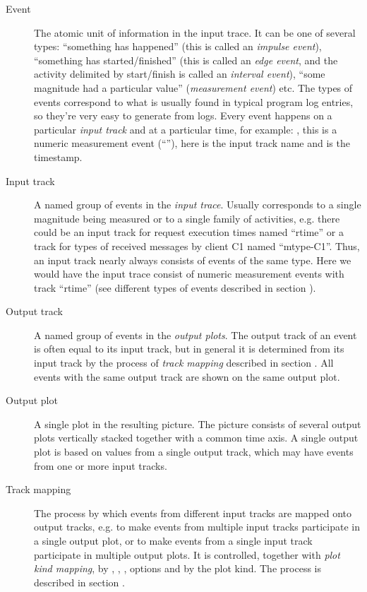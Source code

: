 \documentclass{article}
\begin{document}
\begin{description}
\item[Event] The atomic unit of information in the input trace. It can be one of several types: ``something has happened'' (this is called an \emph{impulse event}), ``something has started/finished'' (this is called an \emph{edge event}, and the activity delimited by start/finish is called an \emph{interval event}), ``some magnitude had a particular value'' (\emph{measurement event}) etc. The types of events correspond to what is usually found in typical program log entries, so they're very easy to generate from logs. Every event happens on a particular \emph{input track} and at a particular time, for example: , this is a numeric measurement event (``\hlverb{=}''), here  is the input track name and  is the timestamp.
\item[Input track] A named group of events in the \emph{input trace}. Usually corresponds to a single magnitude being measured or to a single family of activities, e.g. there could be an input track for request execution times named ``rtime'' or a track for types of received messages by client C1 named ``mtype-C1''. Thus, an input track nearly always consists of events of the same type. Here we would have the input trace consist of numeric measurement events with track ``rtime'' (see different types of events described in section ).
\item[Output track] A named group of events in the \emph{output plots}. The output track of an event is often equal to its input track, but in general it is determined from its input track by the process of \emph{track mapping} described in section . All events with the same output track are shown on the same output plot.
\item[Output plot] A single plot in the resulting picture. The picture consists of several output plots vertically stacked together with a common time axis. A single output plot is based on values from a single output track, which may have events from one or more input tracks.
\item[Track mapping] The process by which events from different input tracks are mapped onto output tracks, e.g. to make events from multiple input tracks participate in a single output plot, or to make events from a single input track participate in multiple output plots. It is controlled, together with \emph{plot kind mapping}, by , , ,  options and by the  plot kind. The process is described in section .

\end{description}
\end{document}
